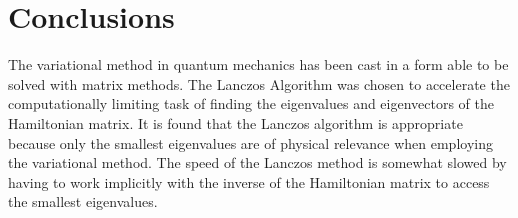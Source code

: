 \documentclass[12pt, a4paper, twocolumn]{article}
\begin{document}
\section{Conclusions}
\label{sec:conc}

The variational method in quantum mechanics has been cast in a form able to be solved with matrix methods. The Lanczos Algorithm was chosen to accelerate the computationally limiting task of finding the eigenvalues and eigenvectors of the Hamiltonian matrix. It is found that the Lanczos algorithm is appropriate because only the smallest eigenvalues are of physical relevance when employing the variational method. The speed of the Lanczos method is somewhat slowed by having to work implicitly with the inverse of the Hamiltonian matrix to access the smallest eigenvalues. 






\end{document}
